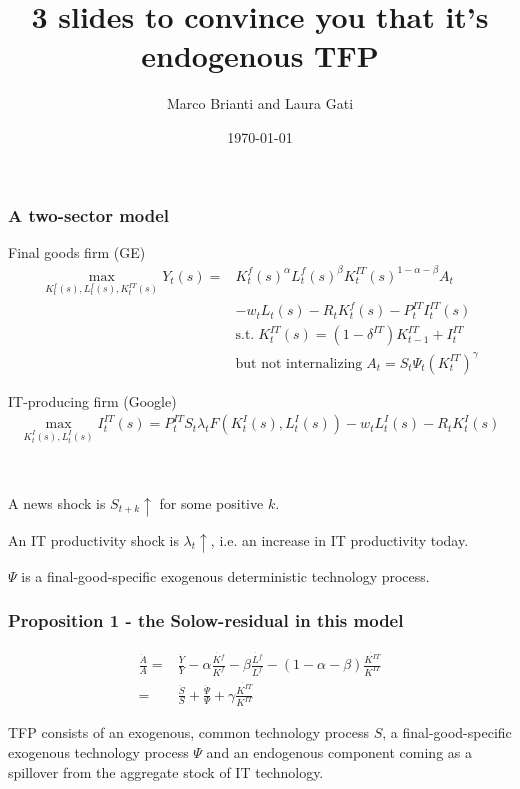 \documentclass{beamer}
\author[Brianti, Gati]{Marco Brianti and Laura Gati}
\institute[Boston College]{Boston College}
\title{3 slides to convince you that it's endogenous TFP}
\date{\today}
\begin{document}
\begin{frame}

\maketitle


\end{frame}


\begin{frame}
\frametitle{A two-sector model}

Final goods firm (GE)
\begin{align*}
\max_{K^f_t(s), L^f_t(s), K^{IT}_t(s) } Y_t(s) =  & K^f_t(s)^{\alpha}L^f_t(s)^{\beta}K^{IT}_t(s)^{1-\alpha - \beta}A_t \\
 & - w_t L_t(s) -R_tK^f_t(s) -P^{IT}_t I^{IT}_t(s) \\
 & \text{s.t.} \; K^{IT}_t(s) =  (1-\delta^{IT})K^{IT}_{t-1} + I^{IT}_t \\
 & \text{but not internalizing} \; A_t =  S_t \Psi_t (K^{IT}_t)^{\gamma}
\end{align*}

IT-producing firm (Google)
\begin{align*}
\max_{K^{I}_t(s), L^{I}_t(s)} I^{IT}_t(s) = P^{IT}_t S_t \lambda_t F(K^I_t(s), L^I_t(s)) -w_t L^I_t(s) - R_t K^I_t(s)
\end{align*}

\

A news shock is $S_{t+k} \uparrow$ for some positive $k$. 

An IT productivity shock is $\lambda_{t} \uparrow$, i.e. an increase in IT productivity today. 

$\Psi$ is a final-good-specific exogenous deterministic technology process.

\end{frame}

\begin{frame}
\frametitle{Proposition 1 - the Solow-residual in this model}

\begin{align*}
\frac{\dot{A}}{A} = & \frac{\dot{Y}}{Y} - \alpha \frac{\dot{K^f}}{K^f} - \beta \frac{\dot{L^f}}{L^f} - (1-\alpha - \beta) \frac{\dot{K^{IT}}}{K^{IT}} \\
= & \frac{\dot{S}}{S} + \frac{\dot{\Psi}}{\Psi} + \gamma \frac{\dot{K^{IT}}}{K^{IT}}
\end{align*}

TFP consists of an exogenous, common technology process $S$, a final-good-specific exogenous technology process $\Psi$ and an endogenous component coming as a spillover from the aggregate stock of IT technology. 
\end{frame}
\end{document}
